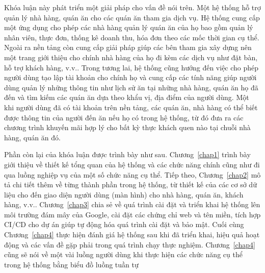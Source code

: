 Khóa luận này phát triển một giải pháp cho vấn đề nói trên.
Một hệ thống hỗ trợ quản lý nhà hàng, quán ăn cho các quán ăn tham gia dịch vụ.
Hệ thống cung cấp một ứng dụng cho phép các nhà hàng quản lý quán ăn của họ bao gồm quản lý nhân viên, thực đơn, thống kê doanh thu, hóa đơn theo các mốc thời gian cụ thể.
Ngoài ra nền tảng còn cung cấp giải pháp giúp các bên tham gia xây dựng nên một trang giới thiệu cho chính nhà hàng của họ đi kèm các dịch vụ như đặt bàn, hỗ trợ khách hàng, v.v..
Trong tương lai, hệ thống cũng hướng đến việc cho phép người dùng tạo lập tài khoản cho chính họ và cung cấp các tính năng giúp người dùng quản lý những thông tin như lịch sử ăn tại những nhà hàng, quán ăn họ đã đến và tìm kiếm các quán ăn dựa theo khẩu vị, địa điểm của người dùng.
Một khi người dùng đã có tài khoản trên nền tảng, các quán ăn, nhà hàng có thể biết được thông tin của người đến ăn nếu họ có trong hệ thống, từ đó đưa ra các chương trình khuyến mãi hợp lý cho bất kỳ thực khách quen nào tại chuỗi nhà hàng, quán ăn đó.

Phần còn lại của khóa luận được trình bày như sau.
Chương~\ref{chap1} trình bày giới thiệu về thiết kế tổng quan của hệ thống và các chức năng chính cũng như đi qua luồng nghiệp vụ của một số chức năng cụ thể.
Tiếp theo, Chương~\ref{chap2} mô tả chi tiết thêm về từng thành phần trong hệ thống, từ thiết kế của các cơ sở dữ liệu cho đến giao diện người dùng (màn hình) cho nhà hàng, quán ăn, khách hàng, v.v..
Chương~\ref{chap3} chia sẻ về quá trình cài đặt và triển khai hệ thống lên môi trường đám mây của Google, cài đặt các chứng chỉ web và tên miền, tích hợp CI/CD cho dự án giúp tự động hóa quá trình cài đặt và bảo mật.
Cuối cùng Chương~\ref{chap4} thực hiện đánh giá hệ thống sau khi đã triển khai, hiệu quả hoạt động và các vấn đề gặp phải trong quá trình chạy thực nghiệm.
Chương~\ref{chap4} cũng sẽ nói về một vài luồng người dùng khi thực hiện các chức năng cụ thể trong hệ thống bằng biểu đồ luồng tuần tự